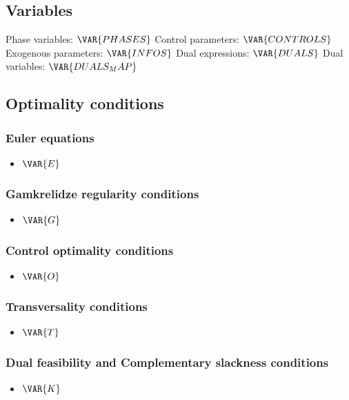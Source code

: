 \documentclass{article}
\begin{document}
\subsection{Variables}

Phase variables: $\VAR{PHASES} $
\newline
Control parameters: $\VAR{CONTROLS} $
\newline
Exogenous parameters: $\VAR{INFOS} $
\newline
Dual expressions: $\VAR{DUALS} $
\newline
Dual variables: $\VAR{DUALS_MAP} $

\subsection{Optimality conditions}
\subsubsection{Euler equations}
\begin{itemize}
    \item $\VAR{E}$
\end{itemize}

\subsubsection{Gamkrelidze regularity conditions}
\begin{itemize}
    \item $\VAR{G}$
\end{itemize}

\subsubsection{Control optimality conditions}
\begin{itemize}
    \item $\VAR{O}$
\end{itemize}

\subsubsection{Transversality conditions}
\begin{itemize}
    \item $\VAR{T}$
\end{itemize}

\subsubsection{Dual feasibility and Complementary slackness conditions}
\begin{itemize}
    \item $\VAR{K}$
\end{itemize}
\end{document}
